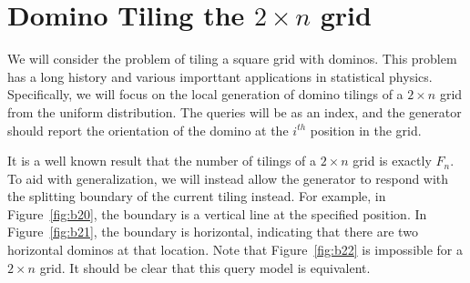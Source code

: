 \section{Domino Tiling the $2\times n$ grid}
We will consider the problem of tiling a square grid with dominos.
This problem has a long history and various importtant applications in statistical physics.
Specifically, we will focus on the local generation of domino tilings of a $2\times n$ grid from the uniform distribution.
The queries will be as an index, and the generator should report the orientation of the domino at the $i^{th}$ position in the grid.

It is a well known result  that the number of tilings of a $2\times n$ grid is exactly $F_n$.
To aid with generalization, we will instead allow the generator to respond with the splitting boundary of the current tiling instead.
For example, in Figure~\ref{fig:b20}, the boundary is a vertical line at the specified position.
In Figure~\ref{fig:b21}, the boundary is horizontal, indicating that there are two horizontal dominos at that location.
Note that Figure~\ref{fig:b22} is impossible for a $2\times n$ grid.
It should be clear that this query model is equivalent.

